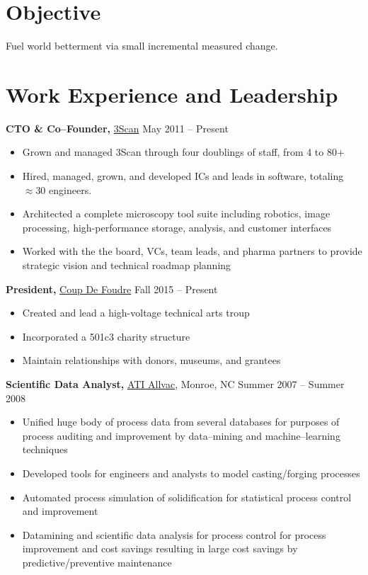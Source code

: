 \documentclass{res}
\begin{document}
\begin{resume}

\section{Objective}
Fuel world betterment via small incremental measured change.

\section{Work Experience and Leadership}

{\bf CTO \& Co--Founder,} \href{http://www.3scan.com}{3Scan} \hfill
May 2011 -- Present
\begin{itemize}  \itemsep -2pt
  \item Grown and managed 3Scan through four doublings of staff, from 4 to 80+
  \item Hired, managed, grown, and developed ICs and leads in software,
    totaling $\approx30$ engineers.
  \item Architected a complete microscopy tool suite including robotics, image processing,
    high-performance storage, analysis, and customer interfaces
  \item Worked with the the board, VCs, team leads, and pharma partners to provide strategic vision
    and technical roadmap planning  
\end{itemize}

{\bf President,}  \href{http://coupdefoud.re}{Coup De Foudre} \hfill   Fall 2015 -- Present
\begin{itemize} \itemsep -2pt
  \item Created and lead a high-voltage technical arts troup
  \item Incorporated a 501c3 charity structure
  \item Maintain relationships with donors, museums, and grantees 
\end{itemize}

{\bf Scientific Data Analyst,} \href{https://www.atimetals.com/}{ATI Allvac}, Monroe, NC \hfill
Summer 2007 -- Summer 2008
\begin{itemize} \itemsep -2pt
  \item Unified huge body of process data from several databases for purposes of
    process auditing and improvement by data--mining and machine--learning techniques
  \item Developed tools for engineers and analysts to model casting/forging processes
  \item Automated process simulation of solidification for statistical process control and improvement
  \item Datamining and scientific data analysis for process control for process improvement and cost savings
    resulting in large cost savings by predictive/preventive maintenance
\end{itemize}


\end{resume}
\end{document}
